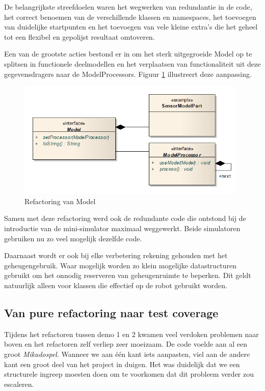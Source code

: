 \documentclass[12pt,a4paper]{report}
\begin{document}
De belangrijkste streefdoelen waren het wegwerken van redundantie in de code, het correct benoemen van de verschillende klassen en namespaces, het toevoegen van duidelijke startpunten en het toevoegen van vele kleine extra's die het geheel tot een flexibel en gepolijst resultaat omtoveren.

Een van de grootste acties bestond er in om het sterk uitgegroeide Model op te splitsen in functionele deelmodellen en het verplaatsen van functionaliteit uit deze gegevensdragers naar de ModelProcessors. Figuur \ref{uml:refactoring} illustreert deze aanpassing.

\begin{figure}[htbp]
  \centering
  \includegraphics[width=110mm]{resources/refactoring-model.png}
  \caption{Refactoring van Model}
  \label{uml:refactoring}
\end{figure}

Samen met deze refactoring werd ook de redundante code die ontstond bij de introductie van de mini-simulator maximaal weggewerkt. Beide simulatoren gebruiken nu zo veel mogelijk dezelfde code.

Daarnaast wordt er ook bij elke verbetering rekening gehouden met het geheugengebruik. Waar mogelijk worden zo klein mogelijke datastructuren gebruikt om het onnodig reserveren van geheugenruimte te beperken. Dit geldt natuurlijk alleen voor klassen die effectief op de robot gebruikt worden.

\subsection{Van pure refactoring naar test coverage}

Tijdens het refactoren tussen demo 1 en 2 kwamen veel verdoken problemen naar boven en het refactoren zelf verliep zeer moeizaam. De code voelde aan al een groot \emph{Mikadospel}. Wanneer we aan \'e\'en kant iets aanpasten, viel aan de andere kant een groot deel van het project in duigen. Het was duidelijk dat we een structurele ingreep moesten doen om te voorkomen dat dit probleem verder zou escaleren.
\end{document}
